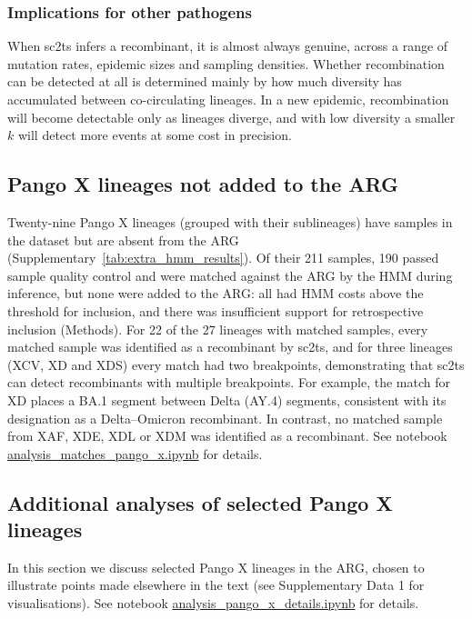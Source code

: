 \documentclass[12pt]{article}
\newcommand{\siref}[1]{Supplementary~\ref{#1}}
\begin{document}
\subsubsection{Implications for other pathogens}
When sc2ts infers a recombinant, it is almost always genuine,
across a range of mutation rates, epidemic sizes and sampling densities.
Whether recombination can be detected at all is determined mainly by how
much diversity has accumulated between co-circulating lineages.
In a new epidemic, recombination will become detectable only as lineages diverge,
and with low diversity a smaller $k$ will detect more events
at some cost in precision.


\subsection{Pango X lineages not added to the ARG}
\label{sec:supplement_rejected_pango_x_lineages}

Twenty-nine Pango X lineages (grouped with their sublineages)
have samples in the dataset but are absent from the ARG
(\siref{tab:extra_hmm_results}).
Of their 211 samples, 190 passed sample quality control and
were matched against the ARG by the HMM during inference,
but none were added to the ARG:
all had HMM costs above the threshold for inclusion,
and there was insufficient support for retrospective inclusion (Methods).
For 22 of the 27 lineages with matched samples,
every matched sample was identified as a recombinant by sc2ts,
and for three lineages (XCV, XD and XDS) every match had two breakpoints,
demonstrating that sc2ts can detect recombinants with multiple breakpoints.
For example, the match for XD places a BA.1 segment
between Delta (AY.4) segments,
consistent with its designation as a Delta--Omicron recombinant.
In contrast, no matched sample from XAF, XDE, XDL or XDM
was identified as a recombinant.
See notebook
\href{https://github.com/jeromekelleher/sc2ts-paper/blob/main/notebooks/analysis\_matches\_pango\_x.ipynb}
{analysis\_matches\_pango\_x.ipynb} for details.


\subsection{Additional analyses of selected Pango X lineages}
\label{sec:supplement_indepth_pango_x_lineages}
In this section we discuss selected Pango X lineages in the ARG,
chosen to illustrate points made elsewhere in the text
(see Supplementary Data 1 for visualisations).
See notebook
\href{https://github.com/jeromekelleher/sc2ts-paper/blob/main/notebooks/analysis\_pango\_x\_details.ipynb}
{analysis\_pango\_x\_details.ipynb} for details.
\end{document}
